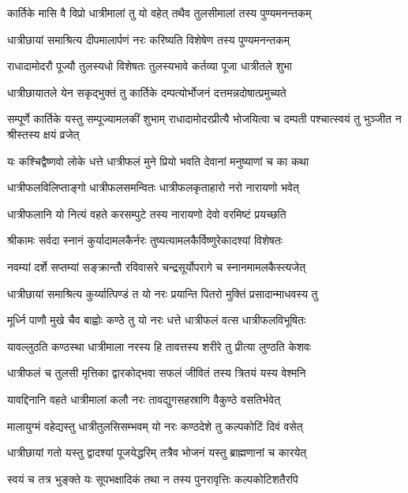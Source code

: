 \twolineshloka
{कार्तिके मासि वै विप्रो धात्रीमालां तु यो वहेत्}
{तथैव तुलसीमालां तस्य पुण्यमनन्तकम्} %

\twolineshloka
{धात्रीछायां समाश्रित्य दीपमालार्पणं नरः}
{करिष्यति विशेषेण तस्य पुण्यमनन्तकम्} %

\twolineshloka
{राधादामोदरौ पूज्यौ तुलस्यधो विशेषतः}
{तुलस्यभावे कर्तव्या पूजा धात्रीतले शुभा} %

\twolineshloka
{धात्रीछायातले येन सकृद्भुक्तं तु कार्तिके}
{दम्पत्योर्भोजनं दत्तमन्नदोषात्प्रमुच्यते} %

\threelineshloka
{सम्पूर्णे कार्तिके यस्तु सम्पूज्यामलकीं शुभाम्}
{राधादामोदरप्रीत्यै भोजयित्वा च दम्पती}
{पश्चात्स्वयं तु भुञ्जीत न श्रीस्तस्य क्षयं व्रजेत्} %

\twolineshloka
{यः कश्चिद्वैष्णवो लोके धत्ते धात्रीफलं मुने}
{प्रियो भवति देवानां मनुष्याणां च का कथा} %

\twolineshloka
{धात्रीफलविलिप्ताङ्गो धात्रीफलसमन्वितः}
{धात्रीफलकृताहारो नरो नारायणो भवेत्} %

\twolineshloka
{धात्रीफलानि यो नित्यं वहते करसम्पुटे}
{तस्य नारायणो देवो वरमिष्टं प्रयच्छति} %

\twolineshloka
{श्रीकामः सर्वदा स्नानं कुर्यादामलकैर्नरः}
{तुष्यत्यामलकैर्विष्णुरेकादश्यां विशेषतः} %

\twolineshloka
{नवम्यां दर्शे सप्तम्यां सङ्क्रान्तौ रविवासरे}
{चन्द्रसूर्योपरागे च स्नानमामलकैस्त्यजेत्} %

\twolineshloka
{धात्रीछायां समाश्रित्य कुर्य्यात्पिण्डं त यो नरः}
{प्रयान्ति पितरो मुक्तिं प्रसादान्माधवस्य तु} %

\twolineshloka
{मूर्ध्नि पाणौ मुखे चैव बाह्वोः कण्ठे तु यो नरः}
{धत्ते धात्रीफलं वत्स धात्रीफलविभूषितः} %

\twolineshloka
{यावल्लुठति कण्ठस्था धात्रीमाला नरस्य हि}
{तावत्तस्य शरीरे तु प्रीत्या लुण्ठति केशवः} %

\twolineshloka
{धात्रीफलं च तुलसी मृत्तिका द्वारकोद्भवा}
{सफलं जीवितं तस्य त्रितयं यस्य वेश्मनि} %


\twolineshloka
{यावद्दिनानि वहते धात्रीमालां कलौ नरः}
{तावद्युगसहस्राणि वैकुण्ठे वसतिर्भवेत्} %

\twolineshloka
{मालायुग्मं वहेद्यस्तु धात्रीतुलसिसम्भवम्}
{यो नरः कण्ठदेशे तु कल्पकोटिं दिवं वसेत्} %

\twolineshloka
{धात्रीछायां गतो यस्तु द्वादश्यां पूजयेद्धरिम्}
{तत्रैव भोजनं यस्तु ब्राह्मणानां च कारयेत्} %

\twolineshloka
{स्वयं च तत्र भुङ्क्ते यः सूपभक्षादिकं तथा}
{न तस्य पुनरावृत्तिः कल्पकोटिशतैरपि} %


